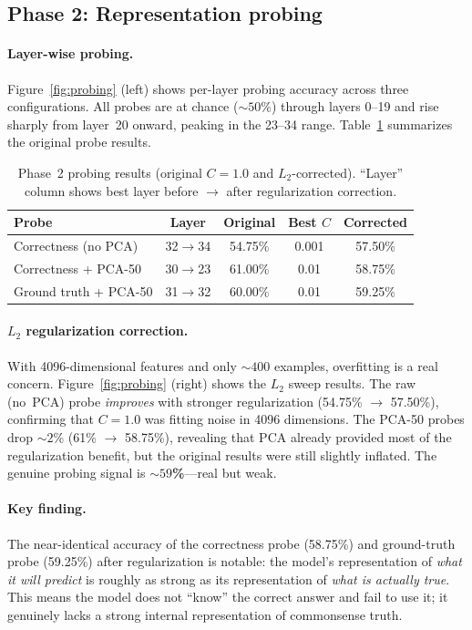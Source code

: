 \documentclass{article}
\begin{document}
\subsection{Phase 2: Representation probing}

\paragraph{Layer-wise probing.}
Figure~\ref{fig:probing} (left) shows per-layer probing accuracy across three configurations.
All probes are at chance (${\sim}50$\%) through layers 0--19 and rise sharply from layer~20 onward, peaking in the 23--34 range.
Table~\ref{tab:probing} summarizes the original probe results.

\begin{table}[t]
\centering
\small
\caption{Phase~2 probing results (original $C{=}1.0$ and $L_2$-corrected). ``Layer'' column shows best layer before $\to$ after regularization correction.}
\label{tab:probing}
\begin{tabular}{lcccc}
\toprule
\textbf{Probe} & \textbf{Layer} & \textbf{Original} & \textbf{Best $C$} & \textbf{Corrected} \\
\midrule
Correctness (no PCA) & 32$\to$34 & 54.75\% & 0.001 & 57.50\% \\
Correctness + PCA-50 & 30$\to$23 & 61.00\% & 0.01 & 58.75\% \\
Ground truth + PCA-50 & 31$\to$32 & 60.00\% & 0.01 & 59.25\% \\
\bottomrule
\end{tabular}
\end{table}

\paragraph{$L_2$ regularization correction.}
With 4096-dimensional features and only ${\sim}400$ examples, overfitting is a real concern.
Figure~\ref{fig:probing} (right) shows the $L_2$ sweep results.
The raw (no~PCA) probe \emph{improves} with stronger regularization (54.75\% $\to$ 57.50\%), confirming that $C{=}1.0$ was fitting noise in 4096 dimensions.
The PCA-50 probes drop ${\sim}2$\% (61\% $\to$ 58.75\%), revealing that PCA already provided most of the regularization benefit, but the original results were still slightly inflated.
The genuine probing signal is \textbf{${\sim}59$\%}---real but weak.

\paragraph{Key finding.}
The near-identical accuracy of the correctness probe (58.75\%) and ground-truth probe (59.25\%) after regularization is notable: the model's representation of \emph{what it will predict} is roughly as strong as its representation of \emph{what is actually true}.
This means the model does not ``know'' the correct answer and fail to use it; it genuinely lacks a strong internal representation of commonsense truth.
\end{document}
